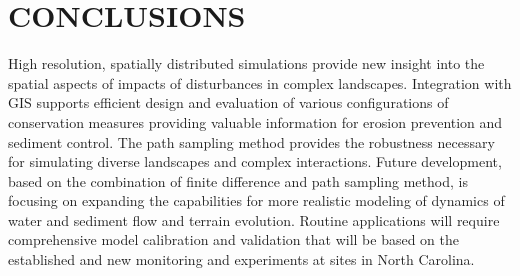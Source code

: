 \documentclass[fleqn,12pt,twoside]{article}
\begin{document}



\section{CONCLUSIONS}

High resolution, spatially distributed simulations provide new insight
into the spatial aspects of impacts of disturbances in complex landscapes.
Integration with GIS supports efficient design and evaluation of various
configurations of conservation measures providing valuable information
for erosion prevention and sediment control. The path sampling method 
provides the robustness necessary for simulating diverse landscapes
and complex interactions. Future development, based on the combination
of finite difference and path sampling method, is focusing on expanding
the capabilities for more realistic modeling of dynamics of water and sediment flow
and terrain evolution. Routine applications will require comprehensive
model calibration and validation that will be based on the established
and new monitoring and experiments at sites in North Carolina.
\end{document}
